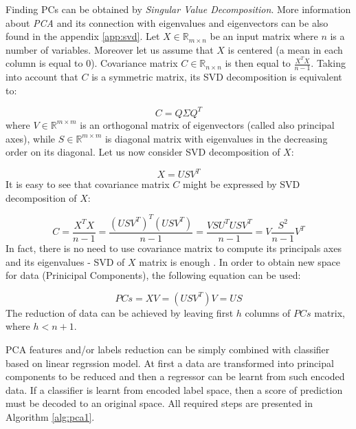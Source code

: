 Finding PCs can be obtained by \textit{Singular Value Decomposition}. More information about \textit{PCA} and its connection with eigenvalues and eigenvectors can be also found in the appendix \ref{app:svd}. Let $X \in \mathbb{R}_{m \times n}$ be an input matrix where $n$ is a number of variables. Moreover let us assume that $X$ is centered (a mean in each column is equal to $0$). Covariance matrix $C \in \mathbb{R}_{n \times n}$ is then equal to $\frac{X^TX}{n-1}$. Taking into account that $C$ is a symmetric matrix, its SVD decomposition is equivalent to:

\begin{equation}\label{eq:pca1}
    C=Q\Sigma{Q^T}
\end{equation}
where $V \in \mathbb{R}^{m \times m}$ is an orthogonal matrix of eigenvectors (called also principal axes), while $S \in \mathbb{R}^{m \times m}$ is diagonal matrix with eigenvalues in the decreasing order on its diagonal. 
Let us now consider SVD decomposition of $X$:

\begin{equation}\label{eq:pca2}
    X=USV^{T}
\end{equation}
It is easy to see that covariance matrix $C$ might be expressed by SVD decomposition of $X$:

\begin{equation}\label{eq:pca3}
    C=\frac{X^TX}{n-1} = \frac{(USV^T)^T(USV^T)}{n-1} = \frac{VSU^TUSV^T}{n-1} = V\frac{S^{2}}{n-1}V^{T} 
\end{equation}
In fact, there is no need to use covariance matrix to compute its principals axes and its eigenvalues - SVD of $X$ matrix is enough \cite{Jolliffe}. In order to obtain new space for data (Prinicipal Components), the following equation can be used:

\begin{equation}\label{eq:pca4}
    PCs = XV = (USV^{T})V = US
\end{equation}
The reduction of data can be achieved by leaving first $h$ columns of $PCs$ matrix, where $h<n+1$.

PCA features and/or labels reduction can be simply combined with classifier based on linear regrssion model. At first a data are transformed into principal components to be reduced and then a regressor can be learnt from such encoded data. If a classifier is learnt from encoded label space, then a score of prediction must be decoded to an original space. All required steps are presented in Algorithm \ref{alg:pca1}.

